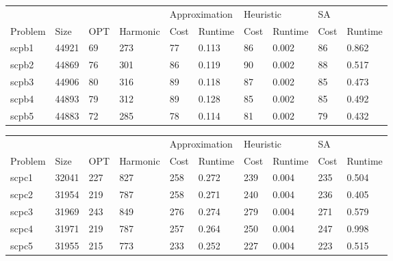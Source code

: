 \documentclass{report}
\begin{document}
\begin{table}[]
\centering
\begin{tabular}{@{}llllllllll@{}}
\toprule
        &       &     &          & \multicolumn{2}{l}{Approximation} & \multicolumn{2}{l}{Heuristic} & \multicolumn{2}{l}{SA} \\
Problem & Size  & OPT & Harmonic & Cost           & Runtime          & Cost         & Runtime        & Cost     & Runtime     \\ \midrule
scpb1   & 44921 & 69  & 273      & 77             & 0.113            & 86           & 0.002          & 86       & 0.862       \\
scpb2   & 44869 & 76  & 301      & 86             & 0.119            & 90           & 0.002          & 88       & 0.517       \\
scpb3   & 44906 & 80  & 316      & 89             & 0.118            & 87           & 0.002          & 85       & 0.473       \\
scpb4   & 44893 & 79  & 312      & 89             & 0.128            & 85           & 0.002          & 85       & 0.492       \\
scpb5   & 44883 & 72  & 285      & 78             & 0.114            & 81           & 0.002          & 79       & 0.432       \\ \bottomrule
\end{tabular}
\end{table}

\begin{table}[]
\centering
\begin{tabular}{@{}llllllllll@{}}
\toprule
        &       &     &          & \multicolumn{2}{l}{Approximation} & \multicolumn{2}{l}{Heuristic} & \multicolumn{2}{l}{SA} \\
Problem & Size  & OPT & Harmonic & Cost           & Runtime          & Cost         & Runtime        & Cost     & Runtime     \\ \midrule
scpc1   & 32041 & 227 & 827      & 258            & 0.272            & 239          & 0.004          & 235      & 0.504       \\
scpc2   & 31954 & 219 & 787      & 258            & 0.271            & 240          & 0.004          & 236      & 0.405       \\
scpc3   & 31969 & 243 & 849      & 276            & 0.274            & 279          & 0.004          & 271      & 0.579       \\
scpc4   & 31971 & 219 & 787      & 257            & 0.264            & 250          & 0.004          & 247      & 0.998       \\
scpc5   & 31955 & 215 & 773      & 233            & 0.252            & 227          & 0.004          & 223      & 0.515       \\ \bottomrule
\end{tabular}
\end{table}
\end{document}

